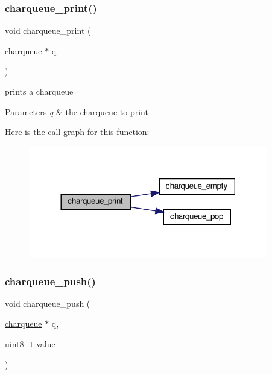\subsubsection{\texorpdfstring{charqueue\+\_\+print()}{charqueue\_print()}}
{\footnotesize\ttfamily void charqueue\+\_\+print (\begin{DoxyParamCaption}\item[{\hyperlink{structcharqueue}{charqueue} $\ast$}]{q }\end{DoxyParamCaption})}



prints a charqueue 


\begin{DoxyParams}{Parameters}
{\em q} & the charqueue to print \\
\hline
\end{DoxyParams}
Here is the call graph for this function\+:\nopagebreak
\begin{figure}[H]
\begin{center}
\leavevmode
\includegraphics[width=296pt]{group__Queue_ga0ea8507c596fb50285773fd50f0a818d_cgraph}
\end{center}
\end{figure}
\mbox{\label{group__Queue_gab21c584ab513656ce228be8faf43072b}} 
\subsubsection{\texorpdfstring{charqueue\+\_\+push()}{charqueue\_push()}}
{\footnotesize\ttfamily void charqueue\+\_\+push (\begin{DoxyParamCaption}\item[{\hyperlink{structcharqueue}{charqueue} $\ast$}]{q,  }\item[{uint8\+\_\+t}]{value }\end{DoxyParamCaption})}



